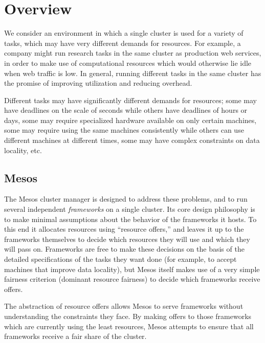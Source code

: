 \documentclass{acm_proc_article-sp}
\begin{document}
\section{Overview}
\label{sec:overview}

We consider an environment in which a single cluster is used for a variety of
tasks, which may have very different demands for resources. For example, a
company might run research tasks in the same cluster as production web services,
in order to make use of computational resources which would otherwise lie idle
when web traffic is low. In general, running different tasks in the same cluster
has the promise of improving utilization and reducing overhead. 

Different tasks may have significantly different demands for resources; some may
have deadlines on the scale of seconds while others have deadlines of hours or
days, some may require specialized hardware available on only certain machines,
some may require using the same machines consistently while others can use
different machines at different times, some may have complex constraints on data
locality, etc. 

\subsection{Mesos}
The Mesos cluster manager is designed to address these problems, and to run
several independent \emph{frameworks} on a single cluster. Its core design philosophy
is to make minimal assumptions about the behavior of the frameworks it hosts. To
this end it allocates resources using ``resource offers,'' and leaves it up to the
frameworks themselves to decide which resources they will use and which they
will pass on. Frameworks are free to make these decisions on the basis of the
detailed specifications of the tasks they want done (for example, to accept
machines that improve data locality), but Mesos itself makes use of a very
simple fairness criterion (dominant resource fairness) to decide which frameworks receive offers.

The abstraction of resource offers allows Mesos to serve frameworks without
understanding the constraints they face. By making offers to those frameworks
which are currently using the least resources, Mesos attempts to ensure that all
frameworks receive a fair share of the cluster. 
\end{document}
